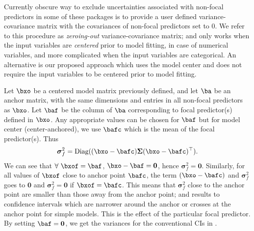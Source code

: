  Currently obscure way to exclude uncertainties associated with non-focal predictors in some of these packages is to provide a user defined variance-covariance matrix with the covariances of non-focal predictors set to $0$. We refer to this procedure as \emph{zeroing-out} variance-covariance matrix; and only works when the input variables are \emph{centered} prior to model fitting, in case of numerical variables, and more complicated when the input variables are categorical. An alternative is our proposed approach which uses the model center and does not require the input variables to be centered prior to model fitting.

Let $\bxo$ be a centered model matrix previously defined, and let $\ba$ be an anchor matrix, with the same dimensions and entries in all non-focal predictors as $\bxo$. Let $\baf$ be the column of $\ba$ corresponding to focal predictor(s) defined in $\bxo$. Any appropriate values can be chosen for $\baf$ but for model center (center-anchored), we use $\bafc$ which is the mean of the focal predictor(s). Thus 
%
\begin{align}\label{eq:centered_variance}
\boldsymbol\sigma_f^2 = \textrm{Diag}((\bxo - \bafc) \boldsymbol{\Sigma} (\bxo - \bafc)^\top).
\end{align}
%
We can see that $\forall ~\bxof=\baf$, $\bxo - \baf = \boldsymbol 0$, hence $\boldsymbol\sigma_f^2 = \boldsymbol{0}$. Similarly, for all values of $\bxof$ close to anchor point $\bafc$, the term $(\bxo - \bafc)$ and $\boldsymbol\sigma_f^2$ goes to $\boldsymbol 0$ and $\boldsymbol\sigma_f^2 = \boldsymbol 0$ if $\bxof=\bafc$. This means that $\boldsymbol\sigma_f^2$ close to the anchor point are smaller than those away from the anchor point; and results to confidence intervals which are narrower around the anchor or crosses at the anchor point for simple models. This is the effect of the particular focal predictor. By setting $\baf = \boldsymbol 0$, we get the variances for the conventional CIs in .


